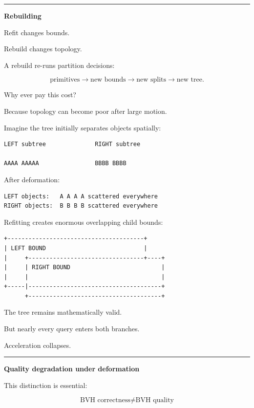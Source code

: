 \begin{center}\rule{0.5\linewidth}{0.5pt}\end{center}

\textbf{Rebuilding}

Refit changes bounds.

Rebuild changes topology.

A rebuild re-runs partition decisions:

\[
\text{primitives}
\rightarrow
\text{new bounds}
\rightarrow
\text{new splits}
\rightarrow
\text{new tree}.
\]

Why ever pay this cost?

Because topology can become poor after large motion.

Imagine the tree initially separates objects spatially:

\begin{verbatim}
LEFT subtree              RIGHT subtree

AAAA AAAAA                BBBB BBBB
\end{verbatim}

After deformation:

\begin{verbatim}
LEFT objects:   A A A A scattered everywhere
RIGHT objects:  B B B B scattered everywhere
\end{verbatim}

Refitting creates enormous overlapping child bounds:

\begin{verbatim}
+---------------------------------------+
| LEFT BOUND                            |
|     +---------------------------------+----+
|     | RIGHT BOUND                          |
|     |                                      |
+-----|--------------------------------------+
      +--------------------------------------+
\end{verbatim}

The tree remains mathematically valid.

But nearly every query enters both branches.

Acceleration collapses.

\begin{center}\rule{0.5\linewidth}{0.5pt}\end{center}

\textbf{Quality degradation under deformation}

This distinction is essential:

\[
\boxed{
\text{BVH correctness}
\ne
\text{BVH quality}
}
\]

